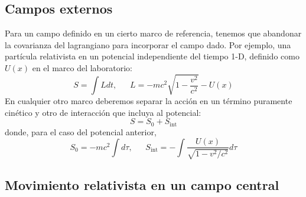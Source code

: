 \documentclass[]{article}
\numberwithin{equation}{section}
\begin{document}
\subsection{Campos externos}
Para un campo definido en un cierto marco de referencia, tenemos que abandonar la covarianza del lagrangiano para incorporar el campo dado. Por ejemplo, una partícula relativista en un potencial independiente del tiempo 1-D, definido como \(U(x)\) en el marco del laboratorio:
\begin{equation}
	S = \int L dt, ~~~~~~~ L = -m c^2 \sqrt{1 - \frac{v^2}{c^2}} - U(x)
\end{equation}
En cualquier otro marco deberemos separar la acción en un término puramente cinético y otro de interacción que incluya al potencial:
\begin{equation}
	S = S_{0} + S_{\mathrm{int}}
\end{equation}
donde, para el caso del potencial anterior,
\begin{equation}
	S_{0} = -m c^2 \int d\tau, ~~~~~~~ S_{\mathrm{int}} = -\int \frac{U(x)}{\sqrt{1 - v^2/c^2}} d\tau
\end{equation}

\subsection{Movimiento relativista en un campo central}
\end{document}
